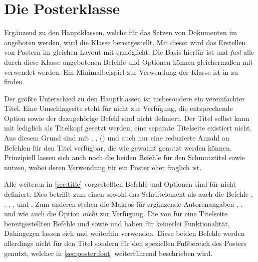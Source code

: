 \chapter[Die Posterklasse \ClassRaw{tudscrposter}{\BooleanFalse}]{%
  Die Posterklasse%
}
%
\begin{DeclareEntity}{}
%
Ergänzend zu den Hauptklassen, welche für das Setzen von Dokumenten im \TUDCD 
angeboten werden, wird die Klasse  bereitgestellt. Mit 
dieser wird das Erstellen von Postern im gleichen Layout mit  
ermöglicht. Die Basis hierfür ist  und \emph{fast} alle 
durch diese Klasse angebotenen Befehle und Optionen können gleichermaßen mit 
 verwendet werden. Ein Minimalbeispiel zur Verwendung der 
Klasse ist in  zu finden.

Der größte Unterschied zu den Hauptklassen ist insbesondere ein vereinfachter 
Titel. Eine Umschlagseite steht für  nicht zur Verfügung, 
die entsprechende Option  sowie der dazugehörige Befehl 
 sind nicht definiert. Der Titel selbst kann mit 
 lediglich als Titelkopf gesetzt werden, eine separate 
Titelseite existiert nicht. Aus diesem Grund sind mit , 
, () und  auch nur eine 
reduzierte Anzahl an Befehlen für den Titel verfügbar, die wie gewohnt genutzt 
werden können. Prinzipiell lassen sich auch noch die beiden Befehle für den 
Schmutztitel  sowie  nutzen, wobei deren 
Verwendung für ein Poster eher fraglich ist.

Alle weiteren in \autoref{sec:title} vorgestellten Befehle und Optionen sind 
für  nicht definiert. Dies betrifft zum einen sowohl das 
Schriftelement  als auch die Befehle , 
, , ,  
und . Zum anderen stehen die Makros für ergänzende 
Autorenangaben , , 
 und  wie auch 
die Option  \emph{nicht} zur Verfügung. Die von 
\KOMAScript für eine Titelseite bereitgestellten Befehle  
und  sowie  und 
 haben für  keinerlei 
Funktionalität. Dahingegen lassen sich  und  
weiterhin verwenden. Diese beiden Befehle werden allerdings nicht für den Titel 
sondern für den speziellen Fußbereich des Posters genutzt, welcher in 
\autoref{sec:poster:foot} weiterführend beschrieben wird.


\end{DeclareEntity}

